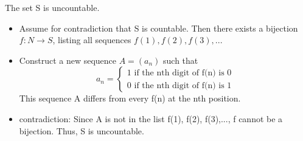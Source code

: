 \documentclass[12pt]{article}
\begin{document}
				The set S is uncountable.
				\begin{itemize}
					\item Assume for contradiction that S is countable. Then there exists a bijection $f: N \rightarrow S$, listing all sequences $f(1), f(2), f(3),...$
					\item Construct a new sequence $A = (a_n)$ such that 
						\begin{equation}
							a_n = \left\{
							\begin{aligned}
								1 \text{ if the nth digit of f(n) is 0} \\
								0 \text{ if the nth digit of f(n) is 1}
							\end{aligned}
							\right.
						\end{equation}
						This sequence A differs from every f(n) at the nth position.
					\item contradiction: Since A is not in the list f(1), f(2), f(3),..., f cannot be a bijection. Thus, S is uncountable.
				\end{itemize}
\end{document}
